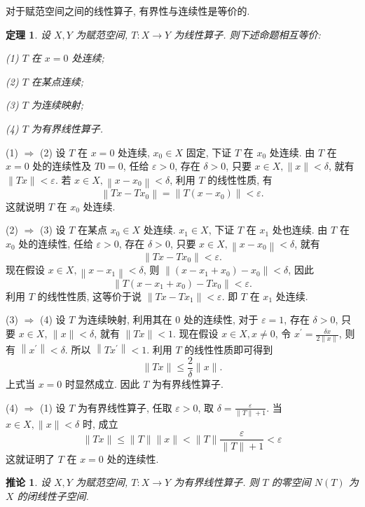 \documentclass[openany]{ctexbook}
\makeatletter
\theoremstyle{kaiti}
\newtheorem{theorem}{定理}[section]
\newtheorem{corollary}{推论}[section]
\theoremstyle{normal}
\renewenvironment{proof}[1][\proofname]{\par
    \pushQED{\qed}%
    \normalfont \topsep6\p@\@plus6\p@\relax
    \trivlist
    \item\relax
    {\heiti #1}\hspace{2\labelsep}\ignorespaces
  }{%
    \popQED\endtrivlist\@endpefalse
  }
\makeatother
\begin{document}
对于赋范空间之间的线性算子, 有界性与连续性是等价的.

\begin{theorem}
设 $X, Y$ 为赋范空间, $T: X \rightarrow Y$ 为线性算子. 则下述命题相互等价:

(1) $T$ 在 $x=0$ 处连续;

(2) $T$ 在某点连续;

(3) $T$ 为连续映射;

(4) $T$ 为有界线性算子.
\end{theorem}

\begin{proof}
(1) $\Rightarrow$ (2) 设 $T$ 在 $x=0$ 处连续, $x_0 \in X$ 固定, 下证 $T$ 在 $x_0$ 处连续. 由 $T$ 在 $x=0$ 处的连续性及 $T 0=0$, 任给 $\varepsilon>0$, 存在 $\delta>0$, 只要 $x \in X,\|x\|<\delta$, 就有 $\|T x\|<\varepsilon$. 若 $x \in X,\left\|x-x_0\right\|<\delta$, 利用 $T$ 的线性性质, 有
$$
\left\|T x-T x_0\right\|=\left\|T\left(x-x_0\right)\right\|<\varepsilon.
$$
这就说明 $T$ 在 $x_0$ 处连续.

(2) $\Rightarrow$ (3) 设 $T$ 在某点 $x_0 \in X$ 处连续. $x_1 \in X$, 下证 $T$ 在 $x_1$ 处也连续. 由 $T$ 在 $x_0$ 处的连续性, 任给 $\varepsilon>0$, 存在 $\delta>0$, 只要 $x \in X,\left\|x-x_0\right\|<\delta$, 就有
$$
\left\|T x-T x_0\right\|<\varepsilon.
$$
现在假设 $x \in X,\left\|x-x_1\right\|<\delta$, 则 $\left\|\left(x-x_1+x_0\right)-x_0\right\|<\delta$, 因此
$$
\left\|T\left(x-x_1+x_0\right)-T x_0\right\|<\varepsilon.
$$
利用 $T$ 的线性性质, 这等价于说 $\left\|T x-T x_1\right\|<\varepsilon$. 即 $T$ 在 $x_1$ 处连续.

(3) $\Rightarrow$ (4) 设 $T$ 为连续映射, 利用其在 0 处的连续性, 对于 $\varepsilon=1$, 存在 $\delta>0$, 只要 $x \in X$, $\|x\|<\delta$, 就有 $\|T x\|<1$. 现在假设 $x \in X, x \neq 0$, 令 $x^{\prime}=\frac{\delta x}{2\|x\|}$, 则有 $\left\|x^{\prime}\right\|<\delta$. 所以 $\left\|T x^{\prime}\right\|<1$. 利用 $T$ 的线性性质即可得到
$$
\|T x\| \leqslant \frac{2}{\delta}\|x\|.
$$
上式当 $x=0$ 时显然成立. 因此 $T$ 为有界线性算子.

(4) $\Rightarrow$ (1) 设 $T$ 为有界线性算子, 任取 $\varepsilon>0$, 取 $\delta=\frac{\varepsilon}{\|T\|+1}$. 当 $x \in X,\|x\|<\delta$ 时, 成立
$$
\|T x\| \leqslant\|T\|\|x\|<\|T\| \frac{\varepsilon}{\|T\|+1}<\varepsilon
$$
这就证明了 $T$ 在 $x=0$ 处的连续性.
\end{proof}

\begin{corollary}
  设 $X, Y$ 为赋范空间, $T: X \rightarrow Y$ 为有界线性算子. 则 $T$ 的零空间 $N(T)$ 为 $X$ 的闭线性子空间.
\end{corollary}
\end{document}
